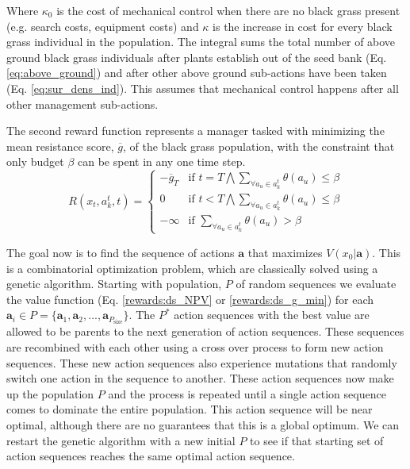 \documentclass[12pt, a4paper]{article}
\begin{document}
Where $\kappa_0$ is the cost of mechanical control when there are no black grass present (e.g. search costs, equipment costs) and $\kappa$ is the increase in cost for every black grass individual in the population. The integral sums the total number of above ground black grass individuals after plants establish out of the seed bank (Eq. \ref{eq:above_ground}) and after other above ground sub-actions have been taken (Eq. \ref{eq:sur_dens_ind}). This assumes that mechanical control happens after all other management sub-actions. 

The second reward function represents a manager tasked with minimizing the mean resistance score, $\overline{g}$, of the black grass population, with the constraint that only budget $\beta$ can be spent in any one time step. 
\begin{equation}\label{rewards:ds_g_min}
	R(x_t, a_k^t, t) = \begin{cases}
	-\overline{g}_T &\text{if } t = T \bigwedge \sum_{\forall a_u \in a_k^t} \theta(a_u) \leq \beta \\
	0 &\text{if } t < T \bigwedge \sum_{\forall a_u \in a_k^t} \theta(a_u) \leq \beta \\
	-\infty &\text{if } \sum_{\forall a_u \in a_k^t} \theta(a_u) > \beta     
	\end{cases}  
\end{equation}

The goal now is to find the sequence of actions $\mathbf{a}$ that maximizes $V(x_0|\mathbf{a})$. This is a combinatorial optimization problem, which are classically solved using a genetic algorithm. Starting with population, $P$ of random sequences we evaluate the value function (Eq. \ref{rewards:ds_NPV} or \ref{rewards:ds_g_min}) for each $\mathbf{a}_i \in P = \{\mathbf{a}_1, \mathbf{a}_2, ..., \mathbf{a}_{P_\text{size}}\}$. The $P^*$ action sequences with the best value are allowed to be parents to the next generation of action sequences. These sequences are recombined with each other using a cross over process to form new action sequences. These new action sequences also experience mutations that randomly switch one action in the sequence to another. These action sequences now make up the population $P$ and the process is repeated until a single action sequence comes to dominate the entire population. This action sequence will be near optimal, although there are no guarantees that this is a global optimum. We can restart the genetic algorithm with a new initial $P$ to see if that starting set of action sequences reaches the same optimal action sequence. 
\end{document}
